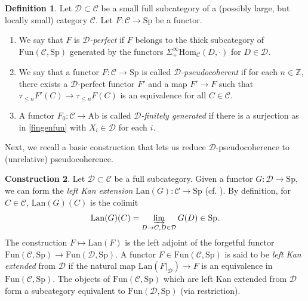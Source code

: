 \documentclass{amsart}
\renewcommand{\hom}{\mathrm{Hom}}
\newcommand{\Sp}{\mathrm{Sp}}
\newcommand{\fun}{\mathrm{Fun}}
\theoremstyle{definition}
\newtheorem{definition}{Definition}[section]
\newtheorem{cons}[definition]{Construction}
\newcommand{\lan}{\mathrm{Lan}}
\begin{document}
\begin{definition} 
Let $\mathcal{D} \subset \mathcal{C}$ be a small full subcategory of a (possibly
large, but locally small) category $\mathcal{C}$. Let $F: \mathcal{C} \to \Sp$ be a functor. 
\begin{enumerate}
\item  
We say that $F$ is \emph{$\mathcal{D}$-perfect} if $F$ belongs to the thick subcategory of $\fun(\mathcal C,\Sp)$ generated by the functors $\Sigma^\infty_+ \hom_{\mathcal{C}}(D, \cdot)$ for $D
\in \mathcal{D}$.

\item
We say that 
a functor $F: \mathcal{C} \to \Sp$
is called \emph{$\mathcal{D}$-pseudocoherent} if for each $n \in \mathbb{Z}$,
there exists a 
$\mathcal{D}$-perfect functor $F'$ and a map $F' \to F$ such that $\tau_{\leq n}
F'(C) \to \tau_{\leq n} F(C)$ is an equivalence for all $C \in \mathcal{C}$. 
\item A functor $F_0: \mathcal{C} \to \mathrm{Ab}$ 
is called \emph{$\mathcal{D}$-finitely generated} if 
there is a surjection as in \eqref{fingenfun} with $X_i \in \mathcal{D}$ for
each $i$. 
\end{enumerate}
\end{definition} 

Next, we recall a basic construction that lets us reduce
$\mathcal{D}$-pseudocoherence to (unrelative) pseudocoherence. 
\begin{cons}
Let $\mathcal{D} \subset \mathcal{C}$ be a full subcategory. 
Given a functor $G: \mathcal{D} \to \Sp$, we can form the \emph{left Kan
extension} $\lan(G):\mathcal{C} \to \Sp$ (cf. \cite[Sec.~4.3]{HTT}). 
By definition, for $C \in \mathcal{C}$, $\lan(G)(C)$ is the colimit
$$ \lan(G)(C) = \varinjlim_{D \to C, D \in \mathcal{D}} G(D)  \in \Sp.$$
The construction $F \mapsto \lan(F)$ is the left adjoint of the forgetful
functor $\fun(\mathcal{C}, \Sp) \to \fun(\mathcal{D}, \Sp)$.  A functor 
$F \in \fun(\mathcal{C}, \Sp)$ is said to be 
\emph{left Kan extended} from $\mathcal{D}$ if the natural map $\lan(
F|_{\mathcal{D}}) \to F$ is an equivalence in $\fun(\mathcal{C}, \Sp)$. 
The objects of $\fun(\mathcal{C}, \Sp)$ which are left Kan extended from
$\mathcal{D}$ form a subcategory equivalent to $\fun(\mathcal{D}, \Sp)$ (via
restriction). 
\end{cons}
\end{document}
